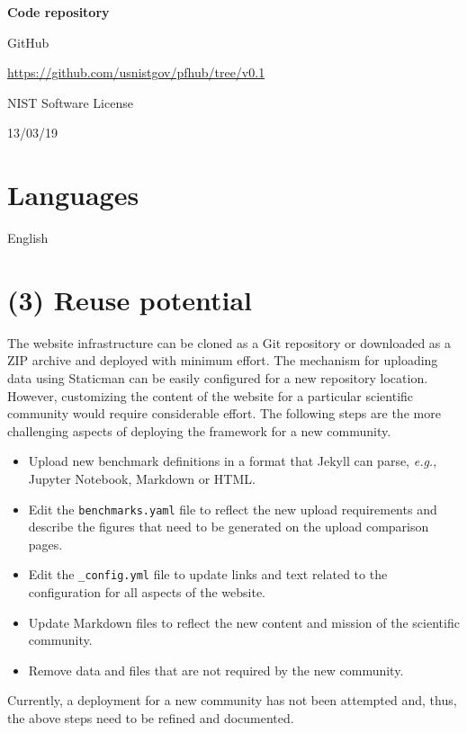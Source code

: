\documentclass{jors}
\begin{document}
{\bf Code repository}

\begin{description}[noitemsep,topsep=0pt]
	\item[Name:] GitHub
	\item[Persistent identifier:] \url{https://github.com/usnistgov/pfhub/tree/v0.1}
	\item[Licence:] NIST Software License~\cite{nistlicense}
	\item[Date published:] 13/03/19
\end{description}

\section*{Languages}

English

\section*{(3) Reuse potential}

The website infrastructure can be cloned as a Git repository or
downloaded as a ZIP archive and deployed with minimum effort. The
mechanism for uploading data using Staticman can be easily configured
for a new repository location. However, customizing the content of the
website for a particular scientific community would require
considerable effort. The following steps are the more challenging
aspects of deploying the framework for a new community.

\begin{itemize}
  \item Upload new benchmark definitions in a format that Jekyll can
    parse, \emph{e.g.}, Jupyter Notebook, Markdown or HTML.
  \item Edit the \texttt{benchmarks.yaml} file to reflect the new
    upload requirements and describe the figures that need to be
    generated on the upload comparison pages.
  \item Edit the \texttt{\_config.yml} file to update links and text
    related to the configuration for all aspects of the website.
  \item Update Markdown files to reflect the new content and mission
    of the scientific community.
  \item Remove data and files that are not required by the new
    community.
\end{itemize}

Currently, a deployment for a new community has not been attempted
and, thus, the above steps need to be refined and documented.
\end{document}
